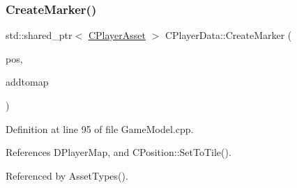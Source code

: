 \subsubsection{\texorpdfstring{Create\+Marker()}{CreateMarker()}}
{\footnotesize\ttfamily std\+::shared\+\_\+ptr$<$ \hyperlink{classCPlayerAsset}{C\+Player\+Asset} $>$ C\+Player\+Data\+::\+Create\+Marker (\begin{DoxyParamCaption}\item[{const \hyperlink{classCPosition}{C\+Position} \&}]{pos,  }\item[{bool}]{addtomap }\end{DoxyParamCaption})}



Definition at line 95 of file Game\+Model.\+cpp.



References D\+Player\+Map, and C\+Position\+::\+Set\+To\+Tile().



Referenced by Asset\+Types().



